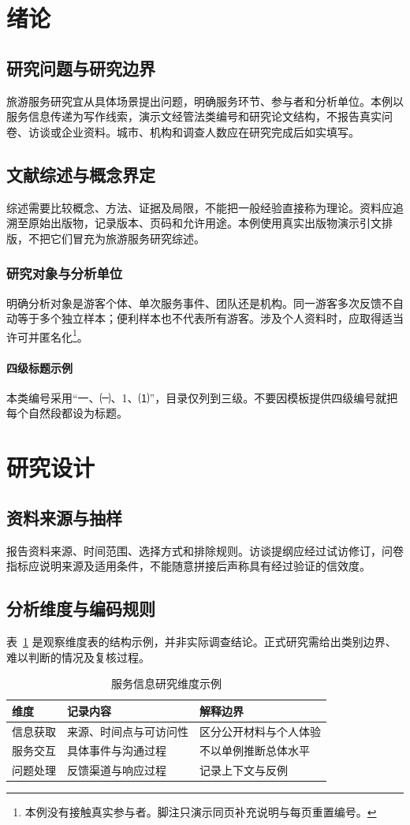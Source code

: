\section{绪论}
\subsection{研究问题与研究边界}
旅游服务研究宜从具体场景提出问题，明确服务环节、参与者和分析单位。本例以服务信息传递为写作线索，演示文经管法类编号和研究论文结构，不报告真实问卷、访谈或企业资料。城市、机构和调查人数应在研究完成后如实填写。
\subsection{文献综述与概念界定}
综述需要比较概念、方法、证据及局限，不能把一般经验直接称为理论。资料应追溯至原始出版物，记录版本、页码和允许用途。本例使用真实出版物演示引文排版\cite{knuth1984,lamport1994}，不把它们冒充为旅游服务研究综述。
\subsubsection{研究对象与分析单位}
明确分析对象是游客个体、单次服务事件、团队还是机构。同一游客多次反馈不自动等于多个独立样本；便利样本也不代表所有游客。涉及个人资料时，应取得适当许可并匿名化\footnote{本例没有接触真实参与者。脚注只演示同页补充说明与每页重置编号。}。
\paragraph{四级标题示例}
本类编号采用“一、㈠、1、⑴”，目录仅列到三级。不要因模板提供四级编号就把每个自然段都设为标题。
\section{研究设计}
\subsection{资料来源与抽样}
报告资料来源、时间范围、选择方式和排除规则。访谈提纲应经过试访修订，问卷指标应说明来源及适用条件，不能随意拼接后声称具有经过验证的信效度。
\subsection{分析维度与编码规则}
表~\ref{tab:tourism} 是观察维度表的结构示例，并非实际调查结论。正式研究需给出类别边界、难以判断的情况及复核过程。
\begin{table}[htbp]\centering\caption{服务信息研究维度示例}\label{tab:tourism}
\begin{tabularx}{\linewidth}{lXX}\toprule 维度 & 记录内容 & 解释边界\\\midrule
信息获取 & 来源、时间点与可访问性 & 区分公开材料与个人体验\\
服务交互 & 具体事件与沟通过程 & 不以单例推断总体水平\\
问题处理 & 反馈渠道与响应过程 & 记录上下文与反例\\\bottomrule\end{tabularx}
\end{table}
